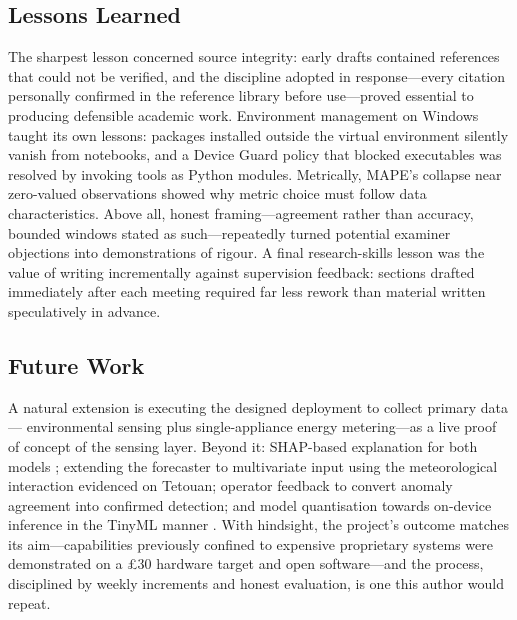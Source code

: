 \documentclass[11pt,a4paper]{article}
\begin{document}
\subsection{Lessons Learned}
The sharpest lesson concerned source integrity: early drafts contained
references that could not be verified, and the discipline adopted in
response---every citation personally confirmed in the reference library before
use---proved essential to producing defensible academic work. Environment
management on Windows taught its own lessons: packages installed outside the
virtual environment silently vanish from notebooks, and a Device Guard policy
that blocked executables was resolved by invoking tools as Python modules.
Metrically, MAPE's collapse near zero-valued observations showed why metric
choice must follow data characteristics. Above all, honest framing---agreement
rather than accuracy, bounded windows stated as such---repeatedly turned
potential examiner objections into demonstrations of rigour. A final
research-skills lesson was the value of writing incrementally against
supervision feedback: sections drafted immediately after each meeting required
far less rework than material written speculatively in advance.

\subsection{Future Work}
A natural extension is executing the designed deployment to collect primary data---
environmental sensing plus single-appliance energy metering---as a live proof of
concept of the sensing layer. Beyond it: SHAP-based explanation for both models
\cite{lundberg2017unified}; extending the forecaster to multivariate input using
the meteorological interaction evidenced on Tetouan; operator feedback to
convert anomaly agreement into confirmed detection; and model quantisation
towards on-device inference in the TinyML manner \cite{warden2019tinyml}. With
hindsight, the project's outcome matches its aim---capabilities previously
confined to expensive proprietary systems were demonstrated on a \pounds30
hardware target and open software---and the process, disciplined by weekly
increments and honest evaluation, is one this author would repeat.

\clearpage
\clearpage
\appendix

\end{document}
